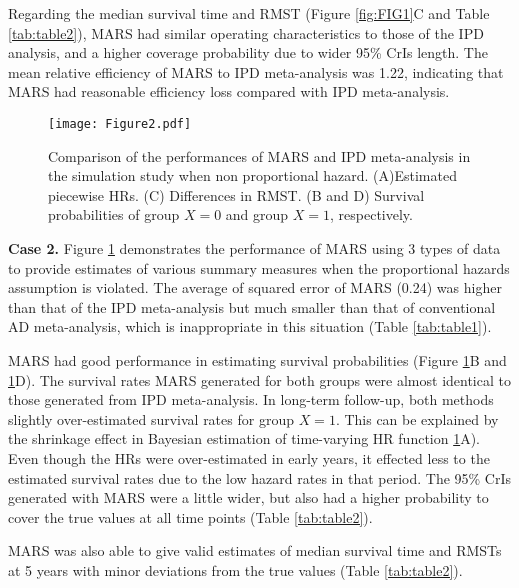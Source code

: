 \documentclass[12pt]{article}
\theoremstyle{mystyle}
\begin{document}
Regarding the median survival time and RMST (Figure \ref{fig:FIG1}C and Table \ref{tab:table2}), MARS had similar operating characteristics to those of the IPD analysis, and a higher coverage probability due to wider 95\% CrIs length. The mean relative efficiency of MARS to IPD meta-analysis was 1.22, indicating that MARS had reasonable efficiency loss compared with IPD meta-analysis.  




\begin{figure}[ht]
\begin{center}
\texttt{[image: Figure2.pdf]}
\end{center}\vspace{-25pt}
\caption{\linespread{1.3}\selectfont{}\label{fig:FIG2}{
Comparison of the performances of MARS and IPD meta-analysis in the simulation study when non proportional hazard. (A)Estimated piecewise HRs. (C) Differences in RMST. (B and D) Survival probabilities of group $X=0$ and group $X=1$, respectively.}}\vspace{15pt}
\end{figure}

\noindent\textbf{Case 2.} \hspace{\parindent}
Figure \ref{fig:FIG2} demonstrates the performance of MARS using 3 types of data to provide estimates of various summary measures when the proportional hazards assumption is violated. The average of squared error of MARS (0.24) was higher than that of the IPD meta-analysis but much smaller than that of conventional AD meta-analysis, which is inappropriate in this situation (Table \ref{tab:table1}). 

MARS had good performance in estimating survival probabilities (Figure \ref{fig:FIG2}B and \ref{fig:FIG2}D). The survival rates MARS generated for both groups were almost identical to those generated from IPD meta-analysis. In long-term follow-up, both methods slightly over-estimated survival rates for group $X=1$. This can be explained by the shrinkage effect in Bayesian estimation of time-varying HR function \ref{fig:FIG2}A). Even though the HRs were over-estimated in early years, it effected less to the estimated survival rates due to the low hazard rates in that period. The 95\% CrIs generated with MARS were a little wider, but also had a higher probability to cover the true values at all time points (Table \ref{tab:table2}).

MARS was also able to give valid estimates of median survival time and RMSTs at 5 years with minor deviations from the true values (Table \ref{tab:table2}). %
\end{document}
